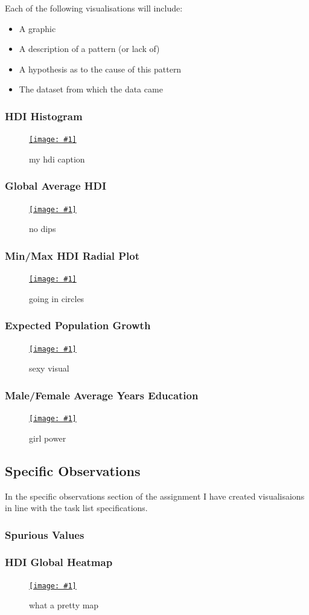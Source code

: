 \documentclass[11pt,a4paper,final]{article}
\newcommand\fig[3]{
\begin{figure}[H]
  \centering
  \href{#3}{\texttt{[image: \#1]}}
  \caption{#2} 
  \label{fig:#1}
\end{figure}
}
\begin{document}
\begin{multicols}{2}
Each of the following visualisations will include:

\begin{itemize}
	\item A graphic
	\item A description of a pattern (or lack of)
	\item A hypothesis as to the cause of this pattern
	\item The dataset from which the data came
\end{itemize}

\subsubsection{HDI Histogram}
\fig{hdi_histogram}{my hdi caption}
a

\subsubsection{Global Average HDI}
\fig{global_average_hdi_areachart}{no dips}
a

\subsubsection{Min/Max HDI Radial Plot}
\fig{min_vs_max_hdi_radialplot}{going in circles}
a

\subsubsection{Expected Population Growth}
\fig{population_growth_ratio_boxplot}{sexy visual}
a

\subsubsection{Male/Female Average Years Education}
\fig{men_vs_women_mean_years_education_barchart}{girl power}
a

\subsection{Specific Observations}
In the specific observations section of the assignment I have created visualisaions in line with the task list specifications.

\subsubsection{Spurious Values}
\subsubsection{HDI Global Heatmap}
\fig{hdi_global_heatmap}{what a pretty map}
a


\end{multicols}
\end{document}
